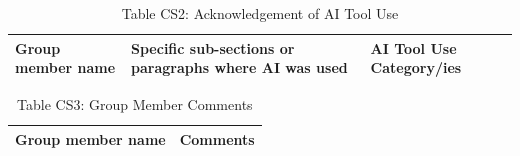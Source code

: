 \documentclass[11pt,a4paper]{report}
\renewcommand{\arraystretch}{0.9}
\begin{document}
\begin{table}[!htbp]
\centering
\caption*{Table CS2: Acknowledgement of AI Tool Use}
\label{tab:ai-tool-use-acknowledgement}
\renewcommand{\arraystretch}{1.25}
\small
\begin{tabularx}{\textwidth}{>{\raggedright\arraybackslash}p{} >{\raggedright\arraybackslash}X >{\raggedright\arraybackslash}p{}}
\toprule
\textbf{Group member name} & \textbf{Specific sub-sections or paragraphs where AI was used} & \textbf{AI Tool Use Category/ies} \\
\midrule
\bottomrule
\end{tabularx}
\normalsize
\end{table}

\begin{table}[!htbp]
\centering
\caption*{Table CS3: Group Member Comments}
\renewcommand{\arraystretch}{1.6}
\begin{tabularx}{\textwidth}{@{}>{\raggedright\arraybackslash}p{} X@{}}
\toprule
\textbf{Group member name} & \textbf{Comments} \\
\midrule
\bottomrule
\end{tabularx}
\end{table}
\end{document}

